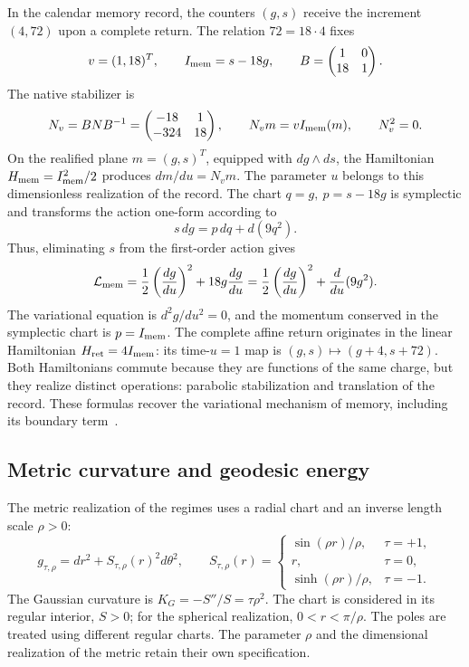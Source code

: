 In the calendar memory record, the counters \((g,s)\)
receive the increment \((4,72)\) upon a complete return. The relation
\(72=18\cdot4\) fixes
\[
 v=(1,18)^T,\qquad I_{\rm mem}=s-18g,
 \qquad B=\begin{pmatrix}1&0\\18&1\end{pmatrix}.
\]
The native stabilizer is
\begin{equation}
 N_v=BNB^{-1}=
 \begin{pmatrix}-18&1\\-324&18\end{pmatrix},\qquad
 N_vm=vI_{\rm mem}(m),\qquad N_v^2=0.
 \label{eq:hc-nv}
\end{equation}
On the realified plane \(m=(g,s)^T\), equipped with \(dg\wedge ds\),
the Hamiltonian \(H_{\rm mem}=I_{\rm mem}^2/2\) produces
\(dm/du=N_vm\). The parameter \(u\) belongs to this dimensionless
realization of the record. The chart
\(q=g,\ p=s-18g\) is symplectic and transforms the action one-form
according to
\begin{equation}
 s\,dg=p\,dq+d(9q^2).
 \label{eq:hc-memoria-borde}
\end{equation}
Thus, eliminating \(s\) from the first-order action gives
\begin{equation}
 \mathcal L_{\rm mem}
 =\frac12\left(\frac{dg}{du}\right)^2
 +18g\frac{dg}{du}
 =\frac12\left(\frac{dg}{du}\right)^2
 +\frac{d}{du}(9g^2).
 \label{eq:hc-lmem}
\end{equation}
The variational equation is \(d^2g/du^2=0\), and the momentum
conserved in the symplectic chart is \(p=I_{\rm mem}\).
The complete affine return originates in the linear Hamiltonian
\(H_{\rm ret}=4I_{\rm mem}\): its time-\(u=1\) map
is \((g,s)\mapsto(g+4,s+72)\). Both Hamiltonians commute
because they are functions of the same charge, but they realize distinct
operations: parabolic stabilization and translation of the record.
These formulas recover the variational mechanism of memory, including
its boundary term~\cite{hmtX}.

\subsection{Metric curvature and geodesic energy}

The metric realization of the regimes uses a radial chart and an
inverse length scale \(\rho>0\):
\begin{equation}
 g_{\tau,\rho}=dr^2+S_{\tau,\rho}(r)^2d\theta^2,
 \qquad
 S_{\tau,\rho}(r)=
 \begin{cases}
 \sin(\rho r)/\rho,&\tau=+1,\\
 r,&\tau=0,\\
 \sinh(\rho r)/\rho,&\tau=-1.
 \end{cases}
 \label{eq:hc-metrique}
\end{equation}
The Gaussian curvature is \(K_G=-S''/S=\tau\rho^2\).
The chart is considered in its regular interior, \(S>0\); for the
spherical realization, \(0<r<\pi/\rho\). The poles are treated using
different regular charts. The parameter \(\rho\) and the dimensional
realization of the metric retain their own specification.

